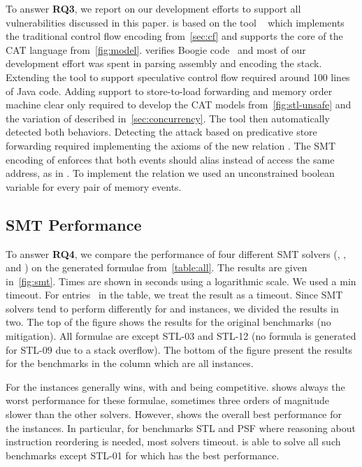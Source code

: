 \documentclass[conference]{IEEEtran}
\begin{document}
To answer {\bfseries RQ3}, we report on our development efforts to support all vulnerabilities discussed in this paper.
\zombmc is based on the tool \dartagnan~\cite{dartagnan-svcomp2021} which implements the traditional control flow encoding from~\autoref{sec:cf} and supports the core of the CAT language from~\autoref{fig:model}.
\dartagnan verifies Boogie code~\cite{leino2008this} and most of our development effort was spent in parsing \xes assembly and encoding the stack.
Extending the tool to support speculative control flow required around 100 lines of Java code.
Adding support to store-to-load forwarding and memory order machine clear only required to develop the CAT models from~\autoref{fig:stl-unsafe} and the variation of \tso described in~\autoref{sec:concurrency}.
The tool then automatically detected both \unsafe behaviors.
Detecting the attack based on predicative store forwarding required implementing the axioms of the new relation .
The SMT encoding of  enforces that both events should alias instead of access the same address, as in .
To implement the  relation we used an unconstrained boolean variable for every pair of memory events.

\subsection{SMT Performance}
\label{sec:perf}

To answer {\bfseries RQ4}, we compare the performance of four different SMT solvers (\zthree, \cvcfour, \yices and \mathsat) on the generated formulae from~\autoref{table:all}.
The results are given in~\autoref{fig:smt}.
Times are shown in seconds using a logarithmic scale.
We used a \usedtimeout min timeout.
For entries \danger\ in the table, we treat the result as a timeout.
Since SMT solvers tend to perform differently for \sat and \unsat instances, we divided the results in two.
The top of the figure shows the results for the original benchmarks (no mitigation). 
All formulae are \sat except STL-03 and STL-12 (no formula is generated for STL-09 due to a stack overflow).
The bottom of the figure present the results for the benchmarks in the \fen column which are all \unsat instances.

For the \sat instances \yices generally wins, with \zthree and \mathsat being competitive.
\cvcfour shows always the worst performance for these \sat formulae, sometimes three orders of magnitude slower than the other solvers.
However, \cvcfour shows the overall best performance for the \unsat instances.
In particular, for benchmarks STL and PSF where reasoning about instruction reordering is needed, most solvers timeout.
\cvcfour is able to solve all such benchmarks except STL-01 for which \mathsat has the best performance.
\end{document}
